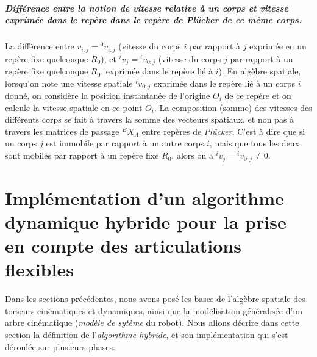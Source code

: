 \documentclass{report}
\begin{document}
\paragraph*{Différence entre la notion de vitesse relative à un corps et vitesse exprimée dans le repère dans le repère de \emph{Plücker} de ce même corps:} La différence entre $v_{i:j} = {^0v_{i:j}}$ (vitesse du corps $i$ par rapport à $j$ exprimée en un repère fixe quelconque $R_0$), et $^iv_j = {^iv_{0:j}}$ (vitesse du corps $j$ par rapport à un repère fixe quelconque $R_0$, exprimée dans le repère lié à $i$).
En algèbre spatiale, lorsqu'on note une vitesse spatiale ${^iv_{0:j}}$ exprimée dans le repère lié à un corps $i$ donné, on considère la position instantanée de l'origine $O_i$ de ce repère et on calcule la vitesse spatiale en ce point $O_i$. La composition (somme) des vitesses des différents corps se fait à travers la somme des vecteurs spatiaux, et non pas à travers les matrices de passage $^BX_A$ entre repères de \emph{Plücker}. C'est à dire que si un corps $j$ est immobile par rapport à un autre corps $i$, mais que tous les deux sont mobiles par rapport à un repère fixe $R_0$, alors on a ${^iv_j } = {^iv_{0:j}} \neq 0$.




\chapter{Implémentation d'un algorithme dynamique hybride pour la prise en compte des articulations flexibles} \label{ch_impl}


Dans les sections précédentes, nous avons posé les bases de l'algèbre spatiale des torseurs cinématiques et dynamiques, ainsi que la modélisation généralisée d'un arbre cinématique (\emph{modèle de sytème} du robot). Nous allons décrire dans cette section la définition de l'\emph{algorithme hybride}, et son implémentation qui s'est déroulée sur plusieurs phases:\\
\end{document}
